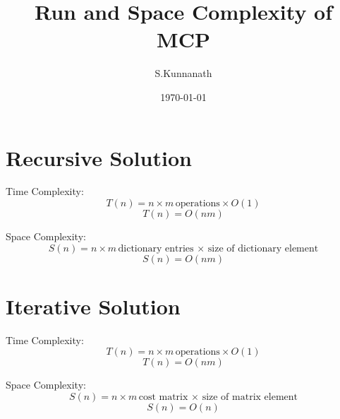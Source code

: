 \documentclass{article}
\title{Run and Space Complexity of MCP}
\author{S.Kunnanath}
\date{\today}
\begin{document}
\maketitle

\section{Recursive Solution}

\begin{flushleft}
    
Time Complexity:
\[T(n) = n \times m \, \textrm{operations} \times  O(1) \]
\[T(n) = O(nm) \]

Space Complexity:
\[S(n) = n \times m \, \textrm{dictionary entries} \, \times \, \textrm{size of dictionary element} \]
\[S(n) = O(nm) \]

\section{Iterative Solution}

Time Complexity:
\[T(n) = n \times m \, \textrm{operations} \times  O(1) \]
\[T(n) = O(nm) \]

Space Complexity:
\[S(n) = n \times m \, \textrm{cost matrix} \, \times \, \textrm{size of matrix element} \]
\[S(n) = O(n) \]

\end{flushleft}
\end{document}
